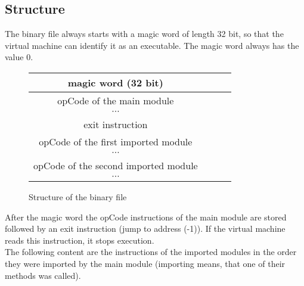 \subsection{Structure}
The binary file always starts with a magic word of length 32 bit, so that the
virtual machine can identify it as an executable. The magic word always has the value 0.
\\ \begin{figure}[h]
		
	\begin{center}
		\begin{tabular}{|c|c|c|c|}
			\hline
				magic word (32 bit) \\
			\hline
				opCode of the main module \\	
			\hline
				$\cdots$ \\
			\hline
				exit instruction \\
			\hline
			opCode of the first imported module \\	
			\hline
				$\cdots$ \\
			\hline
			opCode of the second imported module \\	
			\hline
				$\cdots$ \\
			\hline
		\end{tabular}
	\end{center}
	
	\caption{Structure of the binary file}
	\label{linker:binaryfile:structure}
\end{figure}
After the magic word the opCode instructions of the main module are stored
followed by an exit instruction (jump to address (-1)). If the virtual machine
reads this instruction, it stops execution. \\
The following content are the instructions of the imported modules in the order
they were imported by the main module (importing means, that one of their
methods was called).
